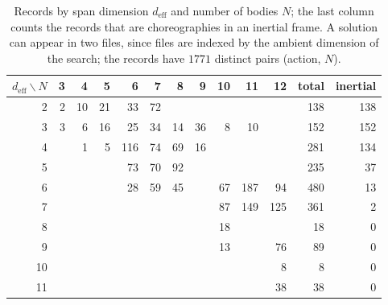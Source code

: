 \documentclass[11pt]{amsart}
\theoremstyle{definition}
\newcommand{\deff}{d_{\mathrm{eff}}}
\begin{document}
\begin{table}[ht]
\caption{Records by span dimension $\deff$ and number of bodies $N$; the last column counts the records that are choreographies in an inertial frame. A solution can appear in two files, since files are indexed by the ambient dimension of the search; the records have $1771$ distinct pairs (action, $N$).}\label{tab:counts}
\centering\small
\begin{tabular}{@{}r rrrrrrrrrr r r@{}}
\toprule
$\deff\backslash N$ & 3 & 4 & 5 & 6 & 7 & 8 & 9 & 10 & 11 & 12 & total & inertial\\
\midrule
2  & 2 & 10 & 21 & 33 & 72 & & & & & & 138 & 138\\
3  & 3 & 6 & 16 & 25 & 34 & 14 & 36 & 8 & 10 & & 152 & 152\\
4  & & 1 & 5 & 116 & 74 & 69 & 16 & & & & 281 & 134\\
5  & & & & 73 & 70 & 92 & & & & & 235 & 37\\
6  & & & & 28 & 59 & 45 & & 67 & 187 & 94 & 480 & 13\\
7  & & & & & & & & 87 & 149 & 125 & 361 & 2\\
8  & & & & & & & & 18 & & & 18 & 0\\
9  & & & & & & & & 13 & & 76 & 89 & 0\\
10 & & & & & & & & & & 8 & 8 & 0\\
11 & & & & & & & & & & 38 & 38 & 0\\
\bottomrule
\end{tabular}
\end{table}
\end{document}
